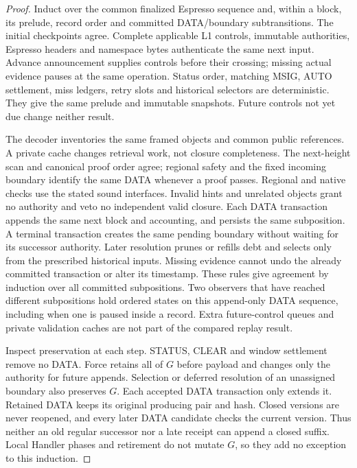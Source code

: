 \documentclass[11pt,a4paper]{article}
\begin{document}
\begin{proof}
Induct over the common finalized Espresso sequence and, within a block,
its prelude, record order and committed DATA/boundary subtransitions.
The initial checkpoints agree. Complete applicable L1 controls,
immutable authorities, Espresso headers and namespace bytes authenticate
the same next input. Advance announcement supplies controls before their
crossing; missing actual evidence pauses at the same operation. Status
order, matching MSIG, AUTO settlement, miss ledgers, retry slots and
historical selectors are deterministic. They give the same prelude and
immutable snapshots. Future controls not yet due change neither result.

The decoder inventories the same framed objects and common public
references. A private cache changes retrieval work, not closure
completeness. The next-height scan and canonical proof order agree;
regional safety and the fixed incoming boundary identify the same DATA
whenever a proof passes. Regional and native checks use the stated sound
interfaces. Invalid hints and unrelated objects grant no authority and
veto no independent valid closure. Each DATA transaction appends the
same next block and accounting, and persists the same subposition.
A terminal transaction creates the same pending boundary without waiting
for its successor authority. Later resolution prunes or refills debt and
selects only from the prescribed historical inputs. Missing evidence
cannot undo the already committed transaction or alter its timestamp.
These rules give agreement by induction over all committed subpositions.
Two observers that have reached different subpositions hold ordered
states on this append-only DATA sequence, including when one is paused
inside a record. Extra future-control queues and private validation
caches are not part of the compared replay result.

Inspect preservation at each step. STATUS, CLEAR and window settlement
remove no DATA. Force retains all of $G$ before payload and changes only
the authority for future appends. Selection or deferred resolution of an unassigned boundary
also preserves $G$. Each accepted DATA transaction only extends it. Retained DATA keeps its
original producing pair and hash. Closed versions are never reopened,
and every later DATA candidate checks the current version. Thus
neither an old regular successor nor a late receipt can append a closed
suffix. Local Handler phases and retirement do not mutate $G$, so they
add no exception to this induction.
\end{proof}
\end{document}

